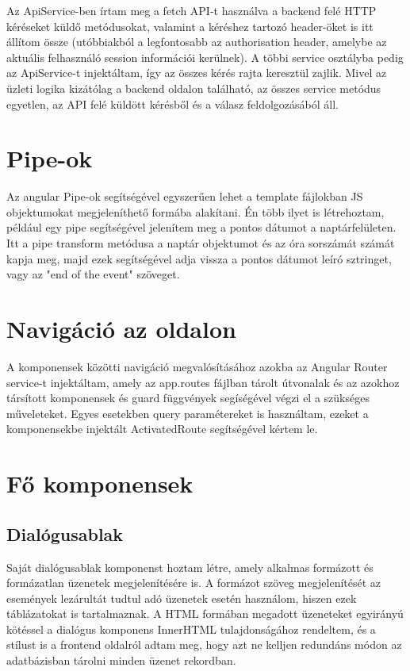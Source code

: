 \documentclass[a4paper,12pt]{report}
\theoremstyle{definition}
\theoremstyle{remark}
\begin{document}
Az ApiService-ben írtam meg a fetch API-t használva a backend felé HTTP kéréseket küldő metódusokat, valamint a kéréshez tartozó header-öket is itt állítom össze (utóbbiakból a legfontosabb az authorisation header, amelybe az aktuális felhasználó session információi kerülnek). A többi service osztályba pedig az ApiService-t injektáltam, így az összes kérés rajta keresztül zajlik.  Mivel az üzleti logika kizátólag a backend oldalon található, az összes service metódus egyetlen, az API felé küldött kérésből és a válasz feldolgozásából áll.

\section{Pipe-ok}

Az angular Pipe-ok segítségével egyszerűen lehet a template fájlokban JS objektumokat megjeleníthető formába alakítani. Én több ilyet is létrehoztam, például egy pipe segítségével jelenítem meg a pontos dátumot a naptárfelületen. Itt a pipe transform metódusa a naptár objektumot és az óra sorszámát számát kapja meg, majd ezek segítségével adja vissza a pontos dátumot leíró sztringet, vagy az "end of the event" szöveget.

\section{Navigáció az oldalon}

A komponensek közötti navigáció megvalósításához azokba az Angular Router service-t injektáltam, amely az app.routes fájlban tárolt útvonalak és az azokhoz társított komponensek és guard függvények segíségével végzi el a szükséges műveleteket. Egyes esetekben query paramétereket is használtam, ezeket a komponensekbe injektált ActivatedRoute segítségével kértem le.

\section{Fő komponensek}

	\subsection{Dialógusablak}

Saját dialógusablak komponenst hoztam létre, amely alkalmas formázott és formázatlan üzenetek megjelenítésére is. A formázot szöveg megjelenítését az események lezárultát tudtul adó üzenetek esetén használom, hiszen ezek táblázatokat is tartalmaznak.  A HTML formában megadott üzeneteket egyirányú kötéssel a dialógus komponens InnerHTML tulajdonságához rendeltem, és a stílust is a frontend oldalról adtam meg, hogy azt ne kelljen redundáns módon az adatbázisban tárolni minden üzenet rekordban.
\end{document}
